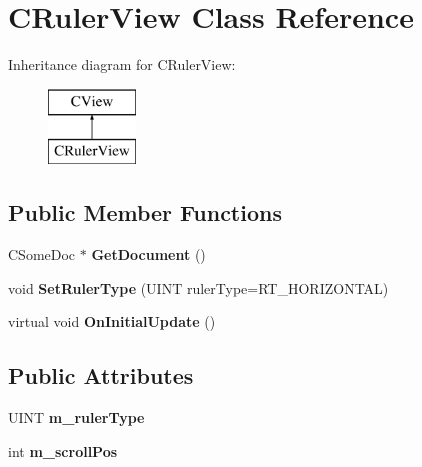 \hypertarget{class_c_ruler_view}{}\section{C\+Ruler\+View Class Reference}
\label{class_c_ruler_view}
Inheritance diagram for C\+Ruler\+View\+:\begin{figure}[H]
\begin{center}
\leavevmode
\includegraphics[height=2.000000cm]{class_c_ruler_view}
\end{center}
\end{figure}
\subsection*{Public Member Functions}
\begin{DoxyCompactItemize}
\item 
\mbox{\label{class_c_ruler_view_af70f2eb8f5d2a49d532134be766cf1f2}} 
C\+Some\+Doc $\ast$ {\bfseries Get\+Document} ()
\item 
\mbox{\label{class_c_ruler_view_a5d8a04d5c63c4ed954a18fd05a3dd657}} 
void {\bfseries Set\+Ruler\+Type} (U\+I\+NT ruler\+Type=R\+T\+\_\+\+H\+O\+R\+I\+Z\+O\+N\+T\+AL)
\item 
\mbox{\label{class_c_ruler_view_a2a6c8504dea0b0df91704ff8acfdaf89}} 
virtual void {\bfseries On\+Initial\+Update} ()
\end{DoxyCompactItemize}
\subsection*{Public Attributes}
\begin{DoxyCompactItemize}
\item 
\mbox{\label{class_c_ruler_view_a32f2c11d8836a3b2464600ff3c9e5001}} 
U\+I\+NT {\bfseries m\+\_\+ruler\+Type}
\item 
\mbox{\label{class_c_ruler_view_a29849fb8eb39e0b97e5fbdf61c49145c}} 
int {\bfseries m\+\_\+scroll\+Pos}
\end{DoxyCompactItemize}
